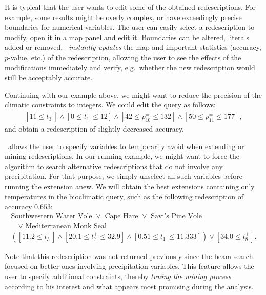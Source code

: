  It is typical that the user wants to
edit some of the obtained redescriptions. For example, some results
might be overly complex, or have exceedingly precise boundaries for
numerical variables. The user can easily select a redescription to
modify, open it in a map panel and edit it. Boundaries can be altered,
literals added or removed. \Siren\ \emph{instantly updates} the map and important
statistics (accuracy, $p$-value, etc.) of the redescription, allowing
the user to see the effects of the modifications immediately and
verify, e.g.\ whether the new redescription would still be acceptably
accurate.

Continuing with our example above, we might want to reduce the
precision of the climatic constraints to integers. We could edit the
query as follows:
\begin{equation*}
\begin{array}{l}
[11 \leq t_{3}^{+}] \land  [0 \leq t_{1}^{=} \leq 12]%
\land  [42 \leq p_{10}^{=} \leq 132] \land [50 \leq p_{11}^{=} \leq 177],
\end{array}
\end{equation*}
and obtain a redescription of slightly decreased accuracy. %

\Siren\ allows the user to specify variables to temporarily 
avoid when extending or mining redescriptions.
In our running example, we might want to force the
algorithm to search alternative redescriptions that do not involve any
 precipitation. For that purpose, we simply unselect all such
variables before running the extension anew. We will obtain the best
extensions containing only temperatures in the bioclimatic query, such
as the following redescription of accuracy $0.653$:
\begin{equation*}
\begin{array}{l}
\text{Southwestern Water Vole }\lor\text{ Cape Hare }\lor\text{ Savi's Pine Vole }\\[1mm]
\quad\lor\text{ Mediterranean Monk Seal}\\[3mm]
( [11.2 \leq t_{3}^{+}] \land  [20.1 \leq t_{7}^{+} \leq 32.9] %
\land  [0.51 \leq t_{1}^{=} \leq 11.333]) \lor  [34.0 \leq t_{8}^{+}].
\end{array}
\end{equation*}

Note that this redescription was not returned previously since the
beam search focused on better ones involving precipitation variables.
This feature allows the user to specify additional constraints,
thereby \emph{tuning the mining process} according to his interest and
what appears most promising during the analysis.


